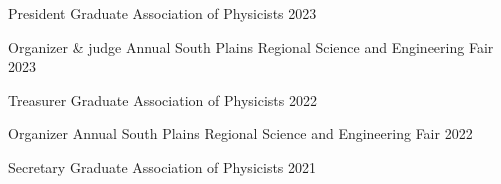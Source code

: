 

\begin{cvhonors}

  \cvhonor
    {President} %
    {Graduate Association of Physicists} %
    {} %
    {2023} %

  \cvhonor
    {Organizer \& judge} %
    {Annual South Plains Regional Science and Engineering Fair} %
    {} %
    {2023} %

  \cvhonor
    {Treasurer} %
    {Graduate Association of Physicists} %
    {} %
    {2022} %

  \cvhonor
    {Organizer} %
    {Annual South Plains Regional Science and Engineering Fair} %
    {} %
    {2022} %

  \cvhonor
    {Secretary} %
    {Graduate Association of Physicists} %
    {} %
    {2021} %

\end{cvhonors}
